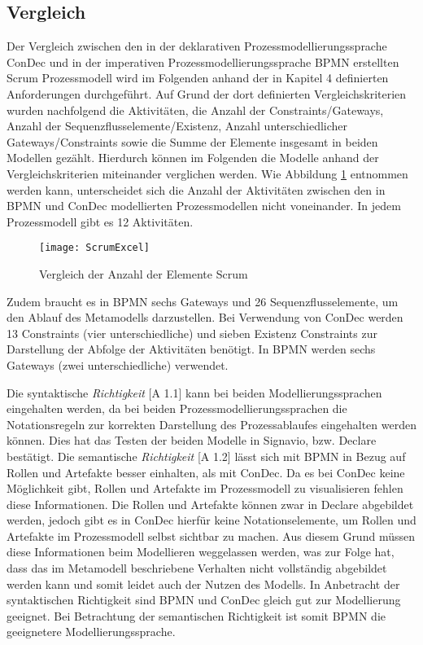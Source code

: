 \subsection{Vergleich}

Der Vergleich zwischen den in der deklarativen Prozessmodellierungssprache ConDec und in der imperativen Prozessmodellierungssprache BPMN erstellten Scrum Prozessmodell wird im Folgenden anhand der in Kapitel 4 definierten Anforderungen durchgeführt. Auf Grund der dort definierten Vergleichskriterien wurden nachfolgend die Aktivitäten, die Anzahl der Constraints/Gateways, Anzahl der Sequenzflusselemente/Existenz, Anzahl unterschiedlicher Gateways/Constraints sowie die Summe der Elemente insgesamt in beiden Modellen gezählt. Hierdurch können im Folgenden die Modelle anhand der Vergleichskriterien miteinander verglichen werden. \newline
Wie Abbildung \ref{fig:ScrumExcel} entnommen werden kann, unterscheidet sich die Anzahl der Aktivitäten zwischen den in BPMN und ConDec modellierten Prozessmodellen nicht voneinander. In jedem Prozessmodell gibt es 12 Aktivitäten.\newline

\begin{figure}[htp]
\begin{center}
  \texttt{[image: ScrumExcel]} %
  \caption{Vergleich der Anzahl der Elemente Scrum}
  \label{fig:ScrumExcel}
\end{center}
\end{figure}


Zudem braucht es in BPMN sechs Gateways und 26 Sequenzflusselemente, um den Ablauf des Metamodells darzustellen. Bei Verwendung von ConDec werden 13 Constraints (vier unterschiedliche) und sieben Existenz Constraints zur Darstellung der Abfolge der Aktivitäten benötigt. In BPMN werden sechs Gateways (zwei unterschiedliche) verwendet.\newline


Die syntaktische \textit{Richtigkeit} [A 1.1] kann bei beiden Modellierungssprachen eingehalten werden, da bei beiden Prozessmodellierungssprachen die Notationsregeln zur korrekten Darstellung des Prozessablaufes eingehalten werden können. Dies hat das Testen der beiden Modelle in Signavio, bzw. Declare bestätigt.\newline
Die semantische \textit{Richtigkeit} [A 1.2] lässt sich mit BPMN in Bezug auf Rollen und Artefakte besser einhalten, als mit ConDec. Da es bei ConDec keine Möglichkeit gibt, Rollen und Artefakte im Prozessmodell zu visualisieren fehlen diese Informationen. Die Rollen und Artefakte können zwar in Declare abgebildet werden, jedoch gibt es in ConDec hierfür keine Notationselemente, um Rollen und Artefakte im Prozessmodell selbst sichtbar zu machen. Aus diesem Grund müssen diese Informationen beim Modellieren weggelassen werden, was zur Folge hat, dass das im Metamodell beschriebene Verhalten nicht vollständig abgebildet werden kann und somit leidet auch der Nutzen des Modells.\newline
In Anbetracht der syntaktischen Richtigkeit sind BPMN und ConDec gleich gut zur Modellierung geeignet. Bei Betrachtung der semantischen Richtigkeit ist somit BPMN die geeignetere Modellierungssprache.


